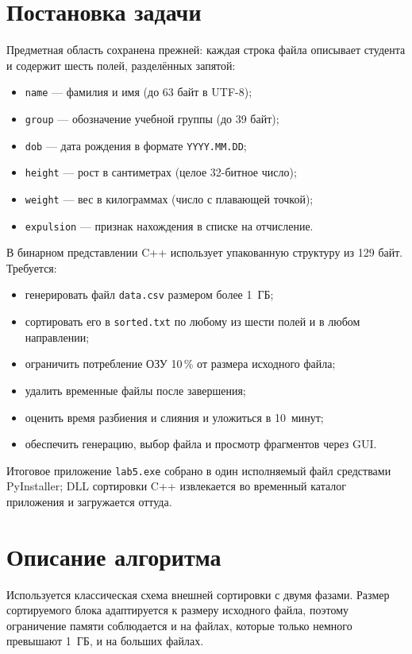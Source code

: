 \documentclass[oneside,a4paper,14pt]{extarticle}
\begin{document}
\section*{Постановка задачи}
Предметная область сохранена прежней: каждая строка файла описывает студента и содержит шесть полей, разделённых запятой:
\begin{itemize}[leftmargin=*]
	\item \texttt{name} --- фамилия и имя (до 63 байт в UTF-8);
	\item \texttt{group} --- обозначение учебной группы (до 39 байт);
	\item \texttt{dob} --- дата рождения в формате \texttt{YYYY.MM.DD};
	\item \texttt{height} --- рост в сантиметрах (целое 32-битное число);
	\item \texttt{weight} --- вес в килограммах (число с плавающей точкой);
	\item \texttt{expulsion} --- признак нахождения в списке на отчисление.
\end{itemize}

В бинарном представлении C++ использует упакованную структуру из 129 байт. Требуется:
\begin{itemize}[leftmargin=*]
	\item генерировать файл \texttt{data.csv} размером более 1~ГБ;
	\item сортировать его в \texttt{sorted.txt} по любому из шести полей и в любом направлении;
	\item ограничить потребление ОЗУ 10\,\% от размера исходного файла;
	\item удалить временные файлы после завершения;
	\item оценить время разбиения и слияния и уложиться в 10~минут;
	\item обеспечить генерацию, выбор файла и просмотр фрагментов через GUI.
\end{itemize}

Итоговое приложение \texttt{lab5.exe} собрано в один исполняемый файл средствами PyInstaller; DLL сортировки C++ извлекается во временный каталог приложения и загружается оттуда.

\section*{Описание алгоритма}
Используется классическая схема внешней сортировки с двумя фазами. Размер сортируемого блока адаптируется к размеру исходного файла, поэтому ограничение памяти соблюдается и на файлах, которые только немного превышают 1~ГБ, и на больших файлах.
\end{document}
